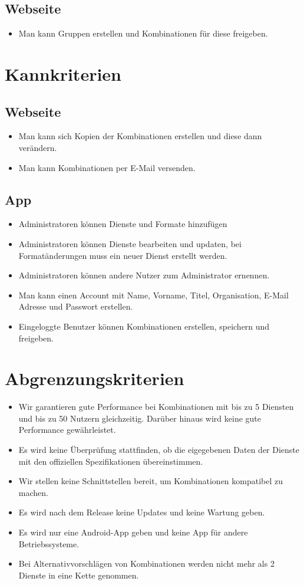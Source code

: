 \subsection{Webseite}
\begin{itemize}
\item Man kann Gruppen erstellen und Kombinationen für diese freigeben.
\end{itemize}

\section{Kannkriterien}
\subsection{Webseite}
\begin{itemize}
\item Man kann sich Kopien der Kombinationen erstellen und diese dann verändern.
\item Man kann Kombinationen per E-Mail versenden.
\end{itemize}

\subsection{App}
\begin{itemize}
\item Administratoren können Dienste und Formate hinzufügen
\item Administratoren können Dienste bearbeiten und updaten, bei Formatänderungen muss ein neuer Dienst erstellt werden.
\item Administratoren können andere Nutzer zum Administrator ernennen.
\item Man kann einen Account mit Name, Vorname, Titel, Organisation, E-Mail Adresse und Passwort erstellen.
\item Eingeloggte Benutzer können Kombinationen erstellen, speichern und freigeben.
\end{itemize}

\section{Abgrenzungskriterien}
\begin{itemize}
\item Wir garantieren gute Performance bei Kombinationen mit bis zu 5 Diensten und bis zu 50 Nutzern gleichzeitig.
Darüber hinaus wird keine gute Performance gewährleistet.
\item Es wird keine Überprüfung stattfinden, ob die eigegebenen Daten der Dienste mit den offiziellen Spezifikationen übereinstimmen.
\item Wir stellen keine Schnittstellen bereit, um Kombinationen kompatibel zu machen.
\item Es wird nach dem Release keine Updates und keine Wartung geben.
\item Es wird nur eine Android-App geben und keine App für andere Betriebssysteme.
\item Bei Alternativvorschlägen von Kombinationen werden nicht mehr als 2 Dienste in eine Kette genommen.
\end{itemize}
